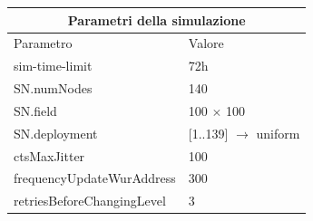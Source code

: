 \documentclass{report}
\begin{document}
\begin{table}[hb]
    \centering
    \begin{tabular}{ |p{5cm}|p{3cm}|  }
        \hline
        \multicolumn{2}{|c|}{Parametri della simulazione}           \\
        \hline
        Parametro                  & Valore                         \\
        \hline
        sim-time-limit             & 72h                            \\
        SN.numNodes                & 140                            \\
        SN.field                   & 100 $\times$ 100               \\
        SN.deployment              & [1..139] $\rightarrow$ uniform \\
        ctsMaxJitter               & 100                            \\
        frequencyUpdateWurAddress  & 300                            \\
        retriesBeforeChangingLevel & 3                              \\
        \hline
    \end{tabular}
\end{table}
\end{document}
